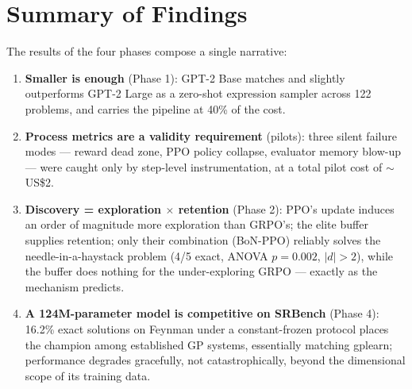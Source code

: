 \section{Summary of Findings}

The results of the four phases compose a single narrative:

\begin{enumerate}
    \item \textbf{Smaller is enough} (Phase 1): GPT-2 Base matches and slightly outperforms GPT-2 Large as a zero-shot expression sampler across 122 problems, and carries the pipeline at 40\% of the cost.
    \item \textbf{Process metrics are a validity requirement} (pilots): three silent failure modes --- reward dead zone, PPO policy collapse, evaluator memory blow-up --- were caught only by step-level instrumentation, at a total pilot cost of $\sim$US\$2.
    \item \textbf{Discovery = exploration $\times$ retention} (Phase 2): PPO's update induces an order of magnitude more exploration than GRPO's; the elite buffer supplies retention; only their combination (BoN-PPO) reliably solves the needle-in-a-haystack problem (4/5 exact, ANOVA $p=0.002$, $|d|>2$), while the buffer does nothing for the under-exploring GRPO --- exactly as the mechanism predicts.
    \item \textbf{A 124M-parameter model is competitive on SRBench} (Phase 4): 16.2\% exact solutions on Feynman under a constant-frozen protocol places the champion among established GP systems, essentially matching gplearn; performance degrades gracefully, not catastrophically, beyond the dimensional scope of its training data.
\end{enumerate}
